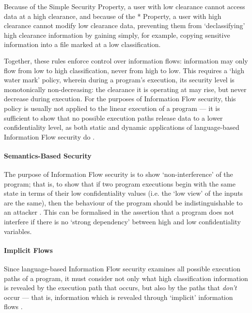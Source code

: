 	Because of the Simple Security Property, a user with low clearance cannot access data at a high clearance, and because of the * Property, a user with high clearance cannot modify low clearance data, preventing them from `declassifying' high clearance information by gaining simply, for example, copying sensitive information into a file marked at a low classification.
	
	Together, these rules enforce control over information flows: information may only flow from low to high classification, never from high to low. This requires a `high water mark' \cite{jones1975highwatermark} policy, wherein during a program's execution, its security level is monotonically non-decreasing: the clearance it is operating at may rise, but never decrease during execution. For the purposes of Information Flow security, this policy is usually not applied to the linear execution of a program --- it is sufficient to show that no possible execution paths release data to a lower confidentiality level, as both static and dynamic applications of language-based Information Flow security do \cite{sabelfeld2003if}.
	
	\cite{denning1976lattice}
	
	\cite{sandhu1994access}
	
	\paragraph{Semantics-Based Security}
	
	The purpose of Information Flow security is to show `non-interference' of the program; that is, to show that if two program executions begin with the same state in terms of their low confidentiality values (i.e. the `low view' of the inputs are the same), then the behaviour of the program should be indistinguishable to an attacker \cite{sabelfeld2003if}. This can be formalised in the assertion that a program does not interfere if there is no `strong dependency' \cite{cohen1977declassification} between high and low confidentiality variables.
	
	\paragraph{Implicit Flows}
	
	Since language-based Information Flow security examines all possible execution paths of a program, it must consider not only what high classification information is revealed by the execution path that occurs, but also by the paths that \textit{don't} occur --- that is, information which is revealed through `implicit' information flows \cite{sabelfeld2003if}.
	
